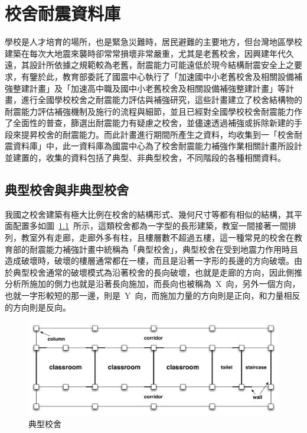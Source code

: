 \renewcommand\thetable{\arabic{chapter}-\arabic{table}}
\renewcommand{\theequation}{\arabic{chapter}-\arabic{equation}}
\chapter{校舍耐震資料庫}

學校是人才培育的場所，也是緊急災難時，居民避難的主要地方，但台灣地區學校建築在每次大地震來襲時卻常常損壞非常嚴重，尤其是老舊校舍，因興建年代久遠，其設計所依據之規範較為老舊，耐震能力可能遠低於現今結構耐震安全上之要求，有鑒於此，教育部委託了國震中心執行了「加速國中小老舊校舍及相關設備補強整建計畫」及「加速高中職及國中小老舊校舍及相關設備補強整建計畫」等計畫，進行全國學校校舍之耐震能力評估與補強研究，這些計畫建立了校舍結構物的耐震能力評估補強機制及施行的流程與細節，並且已經對全國學校校舍耐震能力作了全面性的普查，篩選出耐震能力有疑慮之校舍，並儘速透過補強或拆除新建的手段來提昇校舍的耐震能力。而此計畫進行期間所產生之資料，均收集到一「校舍耐震資料庫」中，此一資料庫為國震中心為了校舍耐震能力補強作業相關計畫所設計並建置的，收集的資料包括了典型、非典型校舍，不同階段的各種相關資料。

\section{典型校舍與非典型校舍}

我國之校舍建築有極大比例在校舍的結構形式、幾何尺寸等都有相似的結構，其平面配置多如圖~\ref{fig:TSB}~所示，這類校舍都為一字型的長形建築，教室一間接著一間排列，教室外有走廊，走廊外多有柱，且樓層數不超過五樓，這一種常見的校舍在教育部的耐震能力補強計畫中統稱為「典型校舍」，典型校舍在受到地震力作用時且造成破壞時，破壞的樓層通常都在一樓，而且是沿著一字形的長邊的方向破壞。由於典型校舍通常的破壞模式為沿著校舍的長向破壞，也就是走廊的方向，因此側推分析所施加的側力也就是沿著長向施加，而長向也被稱為~X~向，另外一個方向，也就一字形較短的那一邊，則是~Y~向，而施加力量的方向則是正向，和力量相反的方向則是反向。

\begin{figure}[hbtp]
  \begin{center}
    \includegraphics[width=1.0\textwidth]{figures/trad-school-building.pdf}
    \caption{典型校舍} 
    \label{fig:TSB}
  \end{center}
\end{figure}

